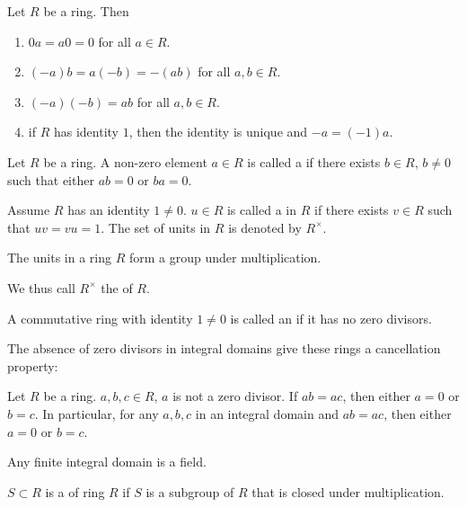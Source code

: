 \begin{proposition}
Let $R$ be a ring. Then
\begin{enumerate}[label=(\arabic*)]
\item $0a=a0=0$ for all $a\in R$.
\item $(-a)b=a(-b)=-(ab)$ for all $a,b\in R$.
\item $(-a)(-b)=ab$ for all $a,b\in R$.
\item if $R$ has identity $1$, then the identity is unique and $-a=(-1)a$.
\end{enumerate}
\end{proposition}

\begin{definition}
Let $R$ be a ring. A non-zero element $a\in R$ is called a  if there exists $b\in R$, $b\neq0$ such that either $ab=0$ or $ba=0$.

Assume $R$ has an identity $1\neq0$. $u\in R$ is called a  in $R$ if there exists $v\in R$ such that $uv=vu=1$. The set of units in $R$ is denoted by $R^\times$.
\end{definition}

\begin{proposition}
The units in a ring $R$ form a group under multiplication.
\end{proposition}

We thus call $R^\times$ the  of $R$.

\begin{definition}
A commutative ring with identity $1\neq0$ is called an  if it has no zero divisors.
\end{definition}

The absence of zero divisors in integral domains give these rings a cancellation property:

\begin{proposition}
Let $R$ be a ring. $a,b,c\in R$, $a$ is not a zero divisor. If $ab=ac$, then either $a=0$ or $b=c$. In particular, for any $a,b,c$ in an integral domain and $ab=ac$, then either $a=0$ or $b=c$.
\end{proposition}

\begin{corollary}
Any finite integral domain is a field.
\end{corollary}

\begin{definition}[Subring]
$S\subset R$ is a  of ring $R$ if $S$ is a subgroup of $R$ that is closed under multiplication.
\end{definition}

